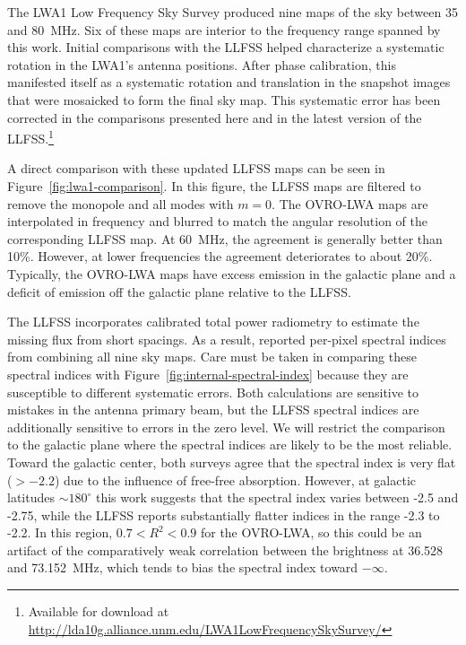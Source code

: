\documentclass[twocolumn]{aastex61}
\begin{document}
The LWA1 Low Frequency Sky Survey \citep[LLFSS;][]{2017MNRAS.469.4537D} produced nine maps of the
sky between 35 and 80~MHz. Six of these maps are interior to the frequency range spanned by this
work. Initial comparisons with the LLFSS helped characterize a systematic rotation in the LWA1's
antenna positions. After phase calibration, this manifested itself as a systematic rotation and
translation in the snapshot images that were mosaicked to form the final sky map. This systematic
error has been corrected in the comparisons presented here and in the latest version of the
LLFSS.\footnote{
    Available for download at \url{http://lda10g.alliance.unm.edu/LWA1LowFrequencySkySurvey/}
}

A direct comparison with these updated LLFSS maps can be seen in Figure~\ref{fig:lwa1-comparison}.
In this figure, the LLFSS maps are filtered to remove the monopole and all modes with $m=0$. The
OVRO-LWA maps are interpolated in frequency and blurred to match the angular resolution of the
corresponding LLFSS map.  At 60~MHz, the agreement is generally better than 10\%. However, at lower
frequencies the agreement deteriorates to about 20\%.  Typically, the OVRO-LWA maps have excess
emission in the galactic plane and a deficit of emission off the galactic plane relative to the
LLFSS.

The LLFSS incorporates calibrated total power radiometry to estimate the missing flux from short
spacings. As a result, \citet{2017MNRAS.469.4537D} reported per-pixel spectral indices from combining
all nine sky maps. Care must be taken in comparing these spectral indices with
Figure~\ref{fig:internal-spectral-index} because they are susceptible to different systematic
errors. Both calculations are sensitive to mistakes in the antenna primary beam, but the LLFSS
spectral indices are additionally sensitive to errors in the zero level. We will restrict the
comparison to the galactic plane where the spectral indices are likely to be the most reliable.
Toward the galactic center, both surveys agree that the spectral index is very flat ($>-2.2$) due to
the influence of free-free absorption.  However, at galactic latitudes $\sim 180^\circ$ this work
suggests that the spectral index varies between -2.5 and -2.75, while the LLFSS reports
substantially flatter indices in the range -2.3 to -2.2. In this region, $0.7 < R^2 < 0.9$ for the
OVRO-LWA, so this could be an artifact of the comparatively weak correlation between the brightness
at 36.528 and 73.152~MHz, which tends to bias the spectral index toward $-\infty$.
\end{document}
